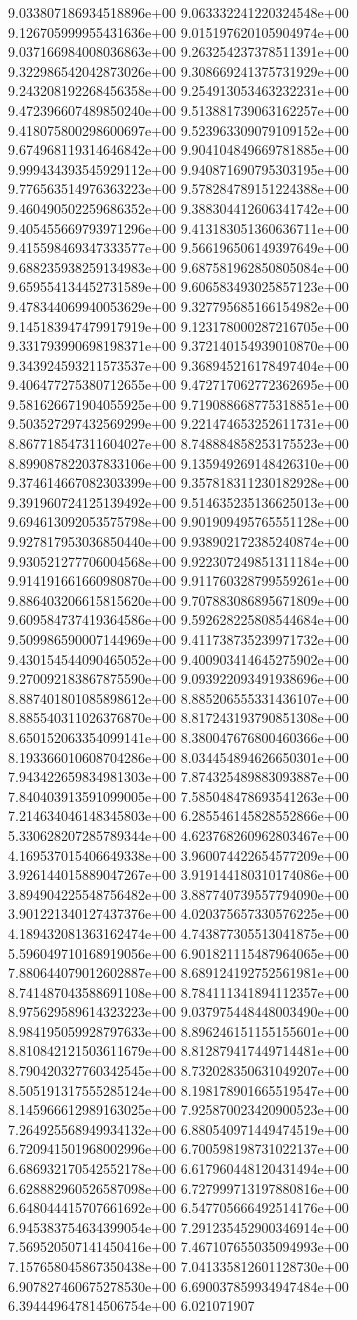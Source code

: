 9.033807186934518896e+00	9.063332241220324548e+00	9.126705999955431636e+00	9.015197620105904974e+00	9.037166984008036863e+00	9.263254237378511391e+00	9.322986542042873026e+00	9.308669241375731929e+00	9.243208192268456358e+00	9.254913053463232231e+00	9.472396607489850240e+00	9.513881739063162257e+00	9.418075800298600697e+00	9.523963309079109152e+00	9.674968119314646842e+00	9.904104849669781885e+00	9.999434393545929112e+00	9.940871690795303195e+00	9.776563514976363223e+00	9.578284789151224388e+00	9.460490502259686352e+00	9.388304412606341742e+00	9.405455669793971296e+00	9.413183051360636711e+00	9.415598469347333577e+00	9.566196506149397649e+00	9.688235938259134983e+00	9.687581962850805084e+00	9.659554134452731589e+00	9.606583493025857123e+00	9.478344069940053629e+00	9.327795685166154982e+00	9.145183947479917919e+00	9.123178000287216705e+00	9.331793990698198371e+00	9.372140154939010870e+00	9.343924593211573537e+00	9.368945216178497404e+00	9.406477275380712655e+00	9.472717062772362695e+00	9.581626671904055925e+00	9.719088668775318851e+00	9.503527297432569299e+00	9.221474653252611731e+00	8.867718547311604027e+00	8.748884858253175523e+00	8.899087822037833106e+00	9.135949269148426310e+00	9.374614667082303399e+00	9.357818311230182928e+00	9.391960724125139492e+00	9.514635235136625013e+00	9.694613092053575798e+00	9.901909495765551128e+00	9.927817953036850440e+00	9.938902172385240874e+00	9.930521277706004568e+00	9.922307249851311184e+00	9.914191661660980870e+00	9.911760328799559261e+00	9.886403206615815620e+00	9.707883086895671809e+00	9.609584737419364586e+00	9.592628225808544684e+00	9.509986590007144969e+00	9.411738735239971732e+00	9.430154544090465052e+00	9.400903414645275902e+00	9.270092183867875590e+00	9.093922093491938696e+00	8.887401801085898612e+00	8.885206555331436107e+00	8.885540311026376870e+00	8.817243193790851308e+00	8.650152063354099141e+00	8.380047676800460366e+00	8.193366010608704286e+00	8.034454894626650301e+00	7.943422659834981303e+00	7.874325489883093887e+00	7.840403913591099005e+00	7.585048478693541263e+00	7.214634046148345803e+00	6.285546145828552866e+00	5.330628207285789344e+00	4.623768260962803467e+00	4.169537015406649338e+00	3.960074422654577209e+00	3.926144015889047267e+00	3.919144180310174086e+00	3.894904225548756482e+00	3.887740739557794090e+00	3.901221340127437376e+00	4.020375657330576225e+00	4.189432081363162474e+00	4.743877305513041875e+00	5.596049710168919056e+00	6.901821115487964065e+00	7.880644079012602887e+00	8.689124192752561981e+00	8.741487043588691108e+00	8.784111341894112357e+00	8.975629589614323223e+00	9.037975448448003490e+00	8.984195059928797633e+00	8.896246151155155601e+00	8.810842121503611679e+00	8.812879417449714481e+00	8.790420327760342545e+00	8.732028350631049207e+00	8.505191317555285124e+00	8.198178901665519547e+00	8.145966612989163025e+00	7.925870023420900523e+00	7.264925568949934132e+00	6.880540971449474519e+00	6.720941501968002996e+00	6.700598198731022137e+00	6.686932170542552178e+00	6.617960448120431494e+00	6.628882960526587098e+00	6.727999713197880816e+00	6.648044415707661692e+00	6.547705666492514176e+00	6.945383754634399054e+00	7.291235452900346914e+00	7.569520507141450416e+00	7.467107655035094993e+00	7.157658045867350438e+00	7.041335812601128730e+00	6.907827460675278530e+00	6.690037859934947484e+00	6.394449647814506754e+00	6.021071907